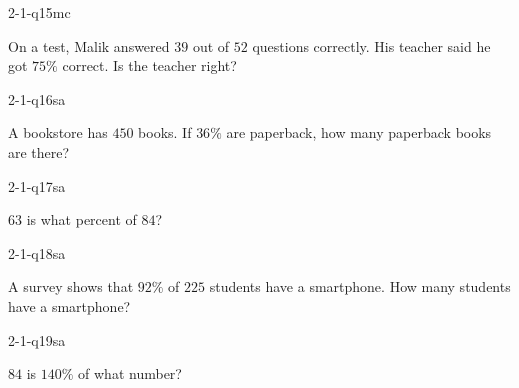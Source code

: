 \begin{practiceQuestion}{2-1-q15}{mc}
\begin{questionText}
On a test, Malik answered $39$ out of $52$ questions correctly. His teacher said he got $75\%$ correct. Is the teacher right?
\end{questionText}
\end{practiceQuestion}


\begin{practiceQuestion}{2-1-q16}{sa}
\begin{questionText}
A bookstore has $450$ books. If $36\%$ are paperback, how many paperback books are there?
\end{questionText}
\end{practiceQuestion}

\begin{practiceQuestion}{2-1-q17}{sa}
\begin{questionText}
$63$ is what percent of $84$?
\end{questionText}
\end{practiceQuestion}

\begin{practiceQuestion}{2-1-q18}{sa}
\begin{questionText}
A survey shows that $92\%$ of $225$ students have a smartphone. How many students have a smartphone?
\end{questionText}
\end{practiceQuestion}

\begin{practiceQuestion}{2-1-q19}{sa}
\begin{questionText}
$84$ is $140\%$ of what number?
\end{questionText}
\end{practiceQuestion}

